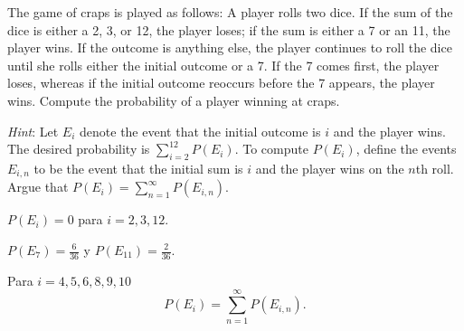 \item The game of craps is played as follows: A player rolls two dice. If the sum of the dice is either a 2, 3, or 12, the player loses; if the sum is either a 7 or an 11, the player wins. If the outcome is anything else, the player continues to roll the dice until she rolls either the initial outcome or a 7. If the 7 comes first, the player loses, whereas if the initial outcome reoccurs before the 7 appears, the player wins. Compute the probability of a player winning at craps.

\emph{Hint}: Let $E_i$ denote the event that the initial outcome is $i$ and the player wins. The desired probability is $\sum_{i=2}^{12} P(E_i)$. To compute $P(E_i)$, define the events $E_{i,n}$ to be the event that the initial sum is $i$ and the player wins on the $n$th roll.
Argue that $P(E_i) = \sum_{n=1}^\infty P(E_{i,n})$.

$P(E_i) = 0$ para $i=2,3,12$.

$P(E_7) = \frac{6}{36}$ y $P(E_{11}) = \frac{2}{36}$.

Para $i=4,5,6,8,9,10$
\[ P(E_i) = \sum_{n=1}^\infty P(E_{i,n}). \]


